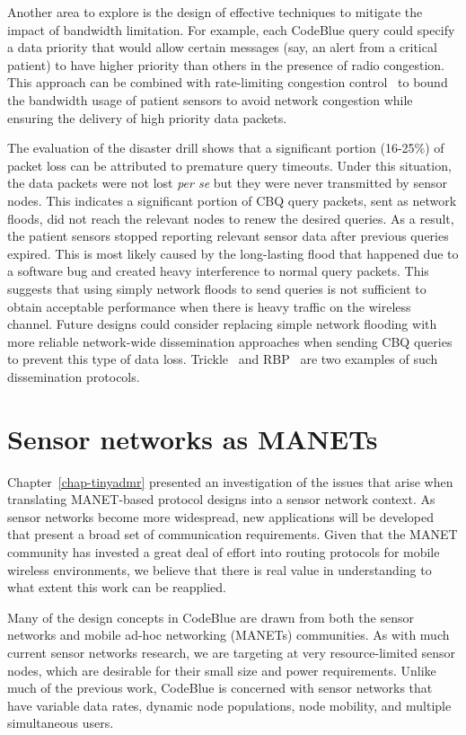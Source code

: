 Another area to explore is the design of effective techniques to mitigate the
impact of bandwidth limitation. For example, each CodeBlue query could specify
a data priority that would allow certain messages (say, an alert from a
critical patient) to have higher priority than others in the presence of radio
congestion. This approach can be combined with rate-limiting congestion
control~\cite{paek_rcrt:_2007, ee-congestion,hull-congestion} to bound the
bandwidth usage of patient sensors to avoid network congestion while 
ensuring the delivery of high priority data packets.

The evaluation of the disaster drill shows that a significant portion
(16-25\%) of packet loss can be attributed to premature query timeouts. 
Under this situation, the data packets were not lost {\em per se} but they
were never transmitted by sensor nodes. This
indicates a significant portion of CBQ query packets, sent as network floods,
did not reach the relevant nodes to renew the desired queries. As a result,
the patient sensors stopped reporting relevant sensor data after previous
queries expired. This is most likely caused by the long-lasting flood that
happened due to a software bug and created heavy interference to normal
query packets. This suggests that using simply network floods to send queries
is not sufficient to obtain acceptable performance when there is heavy traffic
on the wireless channel. Future designs could consider replacing simple
network flooding with more reliable network-wide dissemination approaches 
when sending CBQ queries to prevent this type of data loss.
Trickle~\cite{trickle} and RBP~\cite{rbp-sensys06}
are two examples of such dissemination protocols.

\section{Sensor networks as MANETs}

Chapter~\ref{chap-tinyadmr} presented an investigation of the issues that arise 
when translating MANET-based protocol designs into a sensor 
network context. As sensor networks become more widespread, 
new applications will be developed that present a broad set of 
communication requirements. Given that the MANET community has 
invested a great deal of effort into routing protocols for 
mobile wireless environments, we believe that there is real
value in understanding to what extent this work can be reapplied.

Many of the design concepts in CodeBlue are drawn from both the sensor
networks and mobile ad-hoc networking (MANETs) communities.  As with
much current sensor networks research, we are targeting at very
resource-limited sensor nodes, which are desirable for their small
size and power requirements. Unlike much of the previous work,
CodeBlue is concerned with sensor networks that have variable data
rates, dynamic node populations, node mobility, and multiple
simultaneous users.

